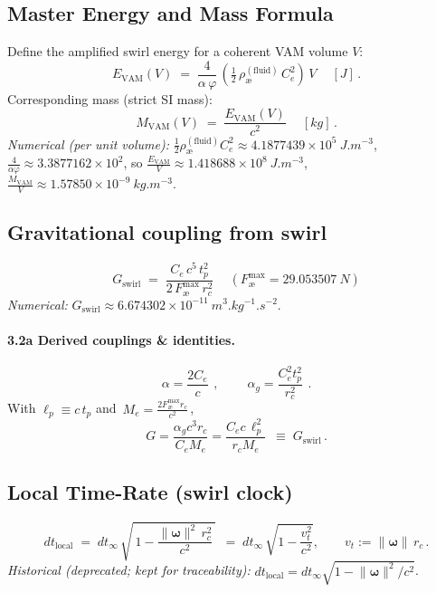 \documentclass[11pt,a4paper]{article}
\newcommand{\aeether}{\text{\ae}} %
\begin{document}
    \subsection{Master Energy and Mass Formula}
    Define the amplified swirl energy for a coherent VAM volume $V$:
    \[
        \boxed{\ E_{\mathrm{VAM}}(V) \;=\; \frac{4}{\alpha\,\varphi}\,\left(\tfrac{1}{2}\,\rho_{\aeether}^{(\mathrm{fluid})}\,C_e^{2}\right)\,V\ }\quad [\si{J}]\,.
    \]
    Corresponding mass (strict SI mass):
    \[
        \boxed{\ M_{\mathrm{VAM}}(V) \;=\; \frac{E_{\mathrm{VAM}}(V)}{c^{2}} \ }\quad [\si{kg}]\,.
    \]
    \noindent\textit{Numerical (per unit volume):} $\tfrac{1}{2}\rho_{\aeether}^{(\mathrm{fluid})}C_e^2 \approx 4.1877439\times 10^{5}\ \si{J.m^{-3}}$, $\frac{4}{\alpha\varphi} \approx 3.3877162\times 10^{2}$, so $\frac{E_{\mathrm{VAM}}}{V} \approx 1.418688\times 10^{8}\ \si{J.m^{-3}}$, $\frac{M_{\mathrm{VAM}}}{V} \approx 1.57850\times 10^{-9}\ \si{kg.m^{-3}}$.

    \subsection{Gravitational coupling from swirl}
    \[
        \boxed{\ G_{\mathrm{swirl}} \;=\; \frac{C_e\,c^{5}\,t_p^{2}}{2\,F_{\aeether}^{\max}\,r_c^{2}}\ }\quad (F_{\aeether}^{\max}=29.053507\ \si{N})
    \]
    \noindent\textit{Numerical:} $G_{\mathrm{swirl}} \approx 6.674302\times 10^{-11}\ \si{m^{3}.kg^{-1}.s^{-2}}$.

    \paragraph{3.2a Derived couplings \& identities.}
    \[
        \boxed{\ \alpha = \frac{2 C_e}{c}\ }\,,\qquad \boxed{\ \alpha_g = \frac{C_e^{2} t_p^{2}}{r_c^{2}}\ }\,.
    \]
    With $\ell_p\equiv c\,t_p$ and $ \boxed{\,M_e = \tfrac{2 F_{\aeether}^{\max} r_c}{c^{2}}\,}$,
    \[
        \boxed{\ G = \frac{\alpha_g c^{3} r_c}{C_e M_e} = \frac{C_e c\, \ell_p^{2}}{r_c M_e}\ }\;\equiv\; G_{\mathrm{swirl}}\,.
    \]

    \subsection{Local Time-Rate (swirl clock)}
    \[
        \boxed{\ dt_{\mathrm{local}} \;=\; dt_{\infty}\,\sqrt{\,1 - \frac{\lVert\bm{\omega}\rVert^{2}\,r_c^{2}}{c^{2}}\,}\ }
        \;=\; dt_{\infty}\,\sqrt{1-\frac{v_t^2}{c^2}},\qquad v_t:=\lVert\bm{\omega}\rVert\,r_c\,.
    \]
    \noindent\emph{Historical (deprecated; kept for traceability):} $dt_{\mathrm{local}} = dt_{\infty}\sqrt{1-\lVert\bm{\omega}\rVert^{2}/c^{2}}$.
\end{document}
